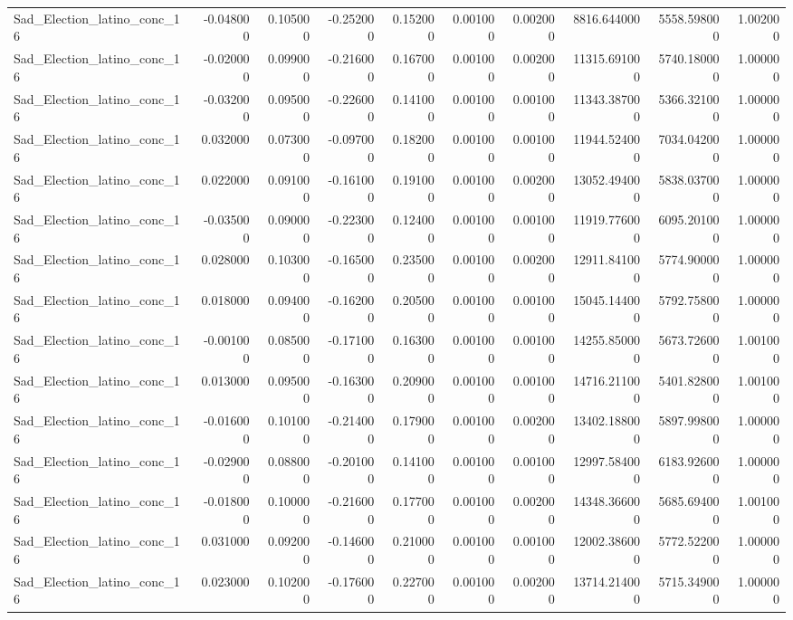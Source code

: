 \begin{table}
\begin{tabular}{lrrrrrrrrr}
Sad_Election_latino_conc_16 & -0.048000 & 0.105000 & -0.252000 & 0.152000 & 0.001000 & 0.002000 & 8816.644000 & 5558.598000 & 1.002000 \\
Sad_Election_latino_conc_16 & -0.020000 & 0.099000 & -0.216000 & 0.167000 & 0.001000 & 0.002000 & 11315.691000 & 5740.180000 & 1.000000 \\
Sad_Election_latino_conc_16 & -0.032000 & 0.095000 & -0.226000 & 0.141000 & 0.001000 & 0.001000 & 11343.387000 & 5366.321000 & 1.000000 \\
Sad_Election_latino_conc_16 & 0.032000 & 0.073000 & -0.097000 & 0.182000 & 0.001000 & 0.001000 & 11944.524000 & 7034.042000 & 1.000000 \\
Sad_Election_latino_conc_16 & 0.022000 & 0.091000 & -0.161000 & 0.191000 & 0.001000 & 0.002000 & 13052.494000 & 5838.037000 & 1.000000 \\
Sad_Election_latino_conc_16 & -0.035000 & 0.090000 & -0.223000 & 0.124000 & 0.001000 & 0.001000 & 11919.776000 & 6095.201000 & 1.000000 \\
Sad_Election_latino_conc_16 & 0.028000 & 0.103000 & -0.165000 & 0.235000 & 0.001000 & 0.002000 & 12911.841000 & 5774.900000 & 1.000000 \\
Sad_Election_latino_conc_16 & 0.018000 & 0.094000 & -0.162000 & 0.205000 & 0.001000 & 0.001000 & 15045.144000 & 5792.758000 & 1.000000 \\
Sad_Election_latino_conc_16 & -0.001000 & 0.085000 & -0.171000 & 0.163000 & 0.001000 & 0.001000 & 14255.850000 & 5673.726000 & 1.001000 \\
Sad_Election_latino_conc_16 & 0.013000 & 0.095000 & -0.163000 & 0.209000 & 0.001000 & 0.001000 & 14716.211000 & 5401.828000 & 1.001000 \\
Sad_Election_latino_conc_16 & -0.016000 & 0.101000 & -0.214000 & 0.179000 & 0.001000 & 0.002000 & 13402.188000 & 5897.998000 & 1.000000 \\
Sad_Election_latino_conc_16 & -0.029000 & 0.088000 & -0.201000 & 0.141000 & 0.001000 & 0.001000 & 12997.584000 & 6183.926000 & 1.000000 \\
Sad_Election_latino_conc_16 & -0.018000 & 0.100000 & -0.216000 & 0.177000 & 0.001000 & 0.002000 & 14348.366000 & 5685.694000 & 1.001000 \\
Sad_Election_latino_conc_16 & 0.031000 & 0.092000 & -0.146000 & 0.210000 & 0.001000 & 0.001000 & 12002.386000 & 5772.522000 & 1.000000 \\
Sad_Election_latino_conc_16 & 0.023000 & 0.102000 & -0.176000 & 0.227000 & 0.001000 & 0.002000 & 13714.214000 & 5715.349000 & 1.000000 \\

\end{tabular}
\end{table}
